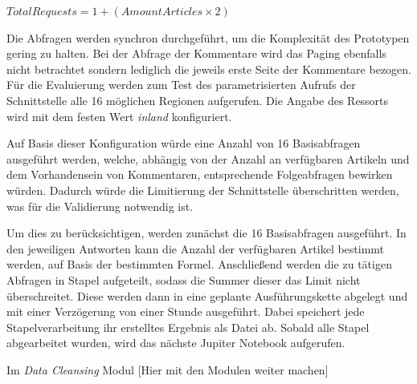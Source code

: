 \(TotalRequests=1 + (AmountArticles × 2)\)

Die Abfragen werden synchron durchgeführt, um die Komplexität des Prototypen gering zu halten. Bei der Abfrage der Kommentare wird das Paging ebenfalls nicht betrachtet sondern lediglich die jeweils erste Seite der Kommentare bezogen. 
Für die Evaluierung werden zum Test des parametrisierten Aufrufs der Schnittstelle alle 16 möglichen Regionen aufgerufen. Die Angabe des Ressorts wird mit dem festen Wert \textit{inland} konfiguriert.

Auf Basis dieser Konfiguration würde eine Anzahl von 16 Basisabfragen ausgeführt werden, welche, abhängig von der Anzahl an verfügbaren Artikeln und dem Vorhandensein von Kommentaren, entsprechende Folgeabfragen bewirken würden. Dadurch würde die Limitierung der Schnittstelle überschritten werden, was für die Validierung notwendig ist. 

Um dies zu berücksichtigen, werden zunächst die 16 Basisabfragen ausgeführt. In den jeweiligen Antworten kann die Anzahl der verfügbaren Artikel bestimmt werden, auf Basis der bestimmten Formel. Anschließend werden die zu tätigen Abfragen in Stapel aufgeteilt, sodass die Summer dieser das Limit nicht überschreitet. Diese werden dann in eine geplante Ausführungskette abgelegt und mit einer Verzögerung von einer Stunde ausgeführt. Dabei speichert jede Stapelverarbeitung ihr erstelltes Ergebnis als Datei ab. 
Sobald alle Stapel abgearbeitet wurden, wird das nächste Jupiter Notebook aufgerufen.

Im \textit{Data Cleansing} Modul [Hier mit den Modulen weiter machen]